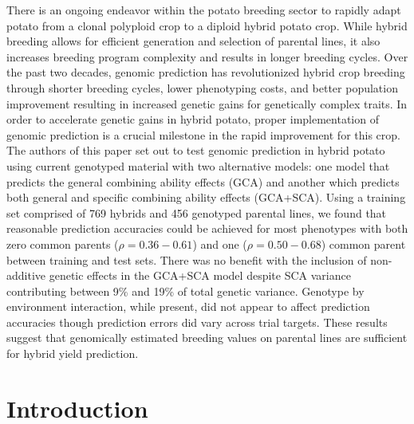 \begin{refsection}
There is an ongoing endeavor within the potato breeding sector to rapidly adapt potato from a clonal polyploid crop to a diploid hybrid potato crop.  While hybrid breeding allows for efficient generation and selection of parental lines, it also increases breeding program complexity and results in longer breeding cycles. Over the past two decades, genomic prediction has revolutionized hybrid crop breeding through shorter breeding cycles, lower phenotyping costs, and better population improvement resulting in increased genetic gains for genetically complex traits. In order to accelerate genetic gains in hybrid potato, proper implementation of genomic prediction is a crucial milestone in the rapid improvement for this crop. The authors of this paper set out to test genomic prediction in hybrid potato using current genotyped material with two alternative models: one model that predicts the general combining ability effects (GCA) and another which predicts both general and specific combining ability effects (GCA+SCA). Using a training set comprised of 769 hybrids and 456 genotyped parental lines, we found that reasonable prediction accuracies could be achieved for most phenotypes with both zero common parents (\(\rho = 0.36 - 0.61\)) and one ($\rho = 0.50 - 0.68$) common parent between training and test sets. There was no benefit with the inclusion of non-additive genetic effects in the GCA+SCA model despite SCA variance contributing between 9\% and 19\% of total genetic variance. Genotype by environment interaction, while present, did not appear to affect prediction accuracies though prediction errors did vary across trial targets. These results suggest that genomically estimated breeding values on parental lines are sufficient for hybrid yield prediction.


\newpage



\section{Introduction}


\end{refsection}
